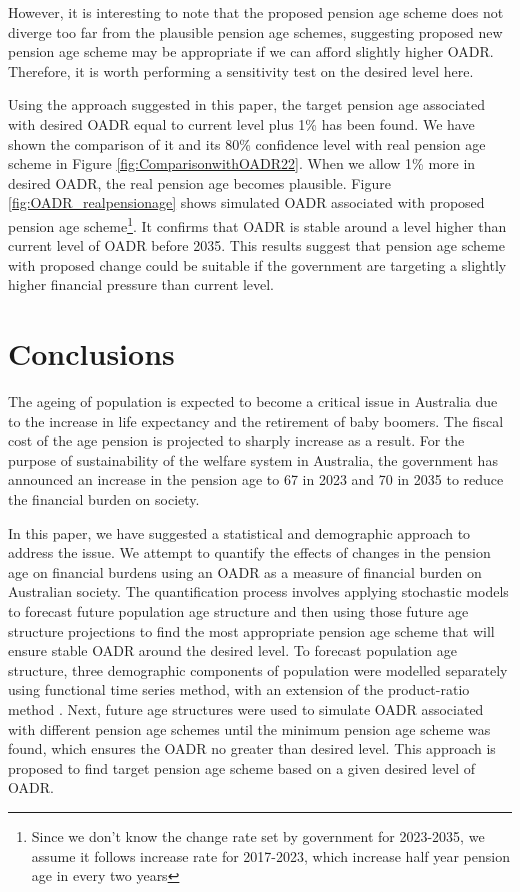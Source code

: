 \documentclass[11pt,a4paper,]{article}
\begin{document}
However, it is interesting to note that the proposed pension age scheme
does not diverge too far from the plausible pension age schemes,
suggesting proposed new pension age scheme may be appropriate if we can
afford slightly higher OADR. Therefore, it is worth performing a
sensitivity test on the desired level here.

Using the approach suggested in this paper, the target pension age
associated with desired OADR equal to current level plus 1\% has been
found. We have shown the comparison of it
 and its 80\% confidence level
with real pension age scheme in Figure \ref{fig:ComparisonwithOADR22}.
When we allow 1\% more in desired OADR, the real pension age becomes
plausible. Figure \ref{fig:OADR_realpensionage} shows simulated OADR
associated with proposed pension age
scheme\footnote{Since we don't know the change rate set by government for 2023-2035, we assume it follows increase rate for 2017-2023, which increase half year pension age in every two years}.
It confirms that OADR is stable around a level higher than current level
of OADR before 2035. This results suggest that pension age scheme with
proposed change could be suitable if the government are targeting a
slightly higher financial pressure than current level.

\section{Conclusions}\label{sec:conclusions}

The ageing of population is expected to become a critical issue in
Australia due to the increase in life expectancy and the retirement of
baby boomers. The fiscal cost of the age pension is projected to sharply
increase as a result. For the purpose of sustainability of the welfare
system in Australia, the government has announced an increase in the
pension age to 67 in 2023 and 70 in 2035 to reduce the financial burden
on society.

In this paper, we have suggested a statistical and demographic approach
to address the issue. We attempt to quantify the effects of changes in
the pension age on financial burdens using an OADR as a measure of
financial burden on Australian society. The quantification process
involves applying stochastic models to forecast future population age
structure and then using those future age structure projections to find
the most appropriate pension age scheme that will ensure stable OADR
around the desired level. To forecast population age structure, three
demographic components of population were modelled separately using
\textcite{HU07} functional time series method, with an extension of the
product-ratio method \autocite{HBY13}. Next, future age structures were
used to simulate OADR associated with different pension age schemes
until the minimum pension age scheme was found, which ensures the OADR
no greater than desired level. This approach is proposed to find target
pension age scheme based on a given desired level of OADR.
\end{document}
